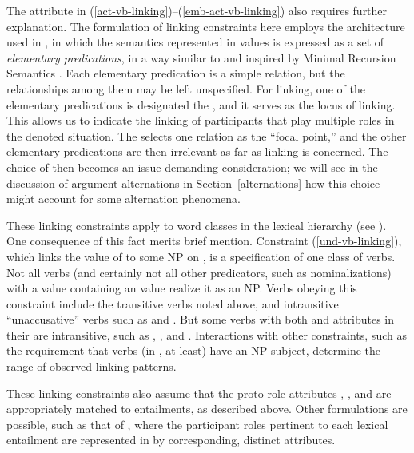 \documentclass[output=paper
 	        ,biblatex
                ,babelshorthands
                ,newtxmath
                ,draftmode
                ,colorlinks, citecolor=brown
]{langscibook}
\begin{document}
The  attribute in (\ref{act-vb-linking})--(\ref{emb-act-vb-linking}) also requires further
explanation. The formulation of linking constraints here employs the architecture used
in \citet{KoenigandDavis2006}, in which the semantics represented in \content values is expressed as
a set of \emph{elementary predications}, in a way similar to and inspired by Minimal Recursion Semantics
\citep{Copestakeetal2001,Copestakeetal2005}.  Each elementary predication is a simple relation, but
the relationships among them may be left unspecified.  For linking, one of the elementary
predications is designated the , and it serves as the locus of linking.  This allows us to
indicate the linking of participants that play multiple roles in the denoted situation. 
The  selects one relation as the ``focal point,'' and the other elementary predications
are then irrelevant as far as linking is concerned. The choice of  then becomes an issue
demanding consideration; we will see in the discussion of argument alternations in
Section~\ref{alternations} how this choice might account for some alternation phenomena. 

These linking constraints apply to word classes in the lexical hierarchy (see
).  One consequence of this fact merits brief mention.  Constraint
(\ref{und-vb-linking}), which links the value of  to some NP on \argst, is a specification
of one class of verbs.  Not all verbs (and certainly not all other predicators, such as
nominalizations) with a \content value containing an  value realize it as an NP.  Verbs
obeying this constraint include the transitive verbs noted above, and intransitive ``unaccusative''
verbs such as  and .  But some verbs with both  and 
attributes in their \content are intransitive, such as , , and
.  Interactions with other constraints, such as the requirement that verbs (in
, at least) have an NP subject, determine the range of observed linking patterns.

These linking constraints also assume that the proto-role attributes , , and  are
appropriately matched to entailments, as described above.  Other formulations are possible, such as
that of \citet{KoenigandDavis2003}, where the participant roles pertinent to each lexical entailment are represented in
\content by corresponding, distinct attributes.
\end{document}
